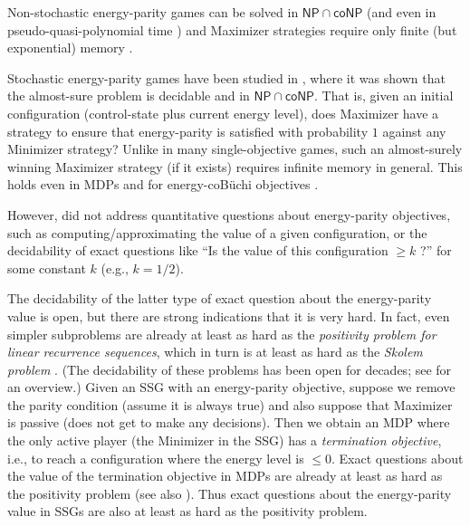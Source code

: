 \documentclass[a4paper,UKenglish,cleveref,autoref,thm-restate]{lipics-v2021}
\newcommand{\+}[1]{\mathbb{#1}}
\newcommand{\?}[1]{\mathcal{#1}}
\newcommand{\NP}{\ensuremath{\mathsf{NP}}}
\newcommand{\coNP}{\ensuremath{\mathsf{coNP}}}
\begin{document}
Non-stochastic energy-parity games can be solved in $\NP \cap \coNP$
(and even in pseudo-quasi-polynomial time \cite{daviaud2018pseudo})
and Maximizer strategies require only finite (but exponential) memory \cite{CD2010}.

Stochastic energy-parity games have been studied in \cite{MSTW2021},
where it was shown that the almost-sure problem is decidable and in $\NP\cap \coNP$.
That is, given an initial configuration (control-state plus current energy level),
does Maximizer have a strategy to ensure
that energy-parity is satisfied with probability $1$ against any Minimizer
strategy?
Unlike in many single-objective games, such an almost-surely winning Maximizer strategy
(if it exists) requires infinite memory in general.
This holds even in MDPs and for energy-coB\"uchi objectives \cite{MSTW2017}.

However, \cite{MSTW2021} did not address quantitative questions about energy-parity
objectives, such as computing/approximating the value of a given
configuration, or the decidability of exact questions like
``Is the value of this configuration $\ge k$ ?'' for some constant $k$ (e.g., $k=1/2$).

The decidability of the latter type of exact question about the energy-parity value is open,
but there are strong indications that it is very hard.
In fact, even simpler subproblems are already at least as hard as the
\emph{positivity problem for linear recurrence sequences},
which in turn is at least as hard as the \emph{Skolem problem}
\cite{Everest:2003}. (The decidability of these problems has been open for
decades; see \cite{OW:2015} for an overview.)
Given an SSG with an energy-parity objective, suppose we remove the parity
condition (assume it is always true) and also suppose that Maximizer is passive
(does not get to make any decisions). Then we obtain an MDP where the only
active player (the Minimizer in the SSG) has a \emph{termination objective},
i.e., to reach a configuration where the energy level is $\le 0$.
Exact questions about the value of the termination objective in MDPs are
already at least as hard as the positivity problem
\cite[Section 5.2.3]{Piribauer:2021} (see also
\cite{Piribauer-Baier:2020,Piribauer-Baier:2023}).
Thus exact questions about the energy-parity value in SSGs are also
at least as hard as the positivity problem.
\end{document}
